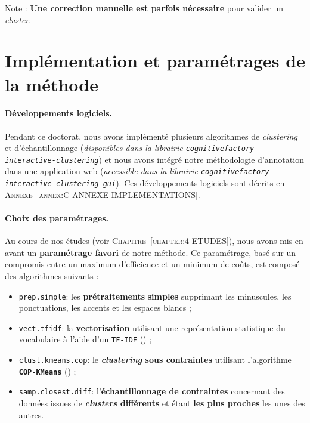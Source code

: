 			Note : \textbf{Une correction manuelle est parfois nécessaire} pour valider un \textit{cluster}.
	
	
	\newpage
	\section{Implémentation et paramétrages de la méthode}
		\label{section:5.4-GUIDE-PARAMETRAGES}
		
		\paragraph{\textcolor{colorSilverLakeBlue}{\faCheckSquare} Développements logiciels.}
		
			Pendant ce doctorat, nous avons implémenté plusieurs algorithmes de \textit{clustering} et d'échantillonnage (\textit{disponibles dans la librairie \texttt{cognitivefactory-interactive-clustering}}) et nous avons intégré notre méthodologie d'annotation dans une application web (\textit{accessible dans la librairie \texttt{cognitivefactory-interactive-clustering-gui}}).
			Ces développements logiciels sont décrits en \textsc{Annexe~\ref{annex:C-ANNEXE-IMPLEMENTATIONS}}.
		
		\paragraph{\textcolor{colorSilverLakeBlue}{\faCheckSquare} Choix des paramétrages.}
		
			Au cours de nos études (voir \textsc{Chapitre~\ref{chapter:4-ETUDES}}), nous avons mis en avant un \textbf{paramétrage favori} de notre méthode.
			Ce paramétrage, basé sur un compromis entre un maximum d'efficience et un minimum de coûts, est composé des algorithmes suivants :
			
			\begin{itemize}
				\item \texttt{prep.simple}: les \textbf{prétraitements} \textbf{simples} supprimant les minuscules, les ponctuations, les accents et les espaces blancs ;
				\item \texttt{vect.tfidf}: la \textbf{vectorisation} utilisant une représentation statistique du vocabulaire à l'aide d'un \texttt{TF-IDF} (\cite{ramos:2003:using-tfidf-determine}) ;
				\item \texttt{clust.kmeans.cop}: le \textbf{\textit{clustering} sous contraintes} utilisant l'algorithme \textbf{\texttt{COP-KMeans}} (\cite{wagstaff-etal:2001:constrained-kmeans-clustering}) ;
				\item \texttt{samp.closest.diff}: l'\textbf{échantillonnage de contraintes} concernant des données issues de \textbf{\textit{clusters} différents} et étant \textbf{les plus proches} les unes des autres.
			\end{itemize}
		
